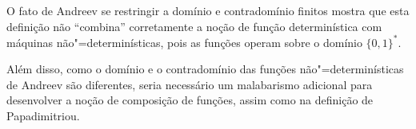 O fato de Andreev se restringir a domínio e contradomínio finitos
mostra que esta definição não ``combina'' corretamente
a noção de função determinística com máquinas não"=determinísticas,
pois as funções operam sobre o domínio $\{0, 1\}^*$.

Além disso,
como o domínio e o contradomínio das funções não"=determinísticas de Andreev
são diferentes,
seria necessário um malabarismo adicional
para desenvolver a noção de composição de funções,
assim como na definição de Papadimitriou.
